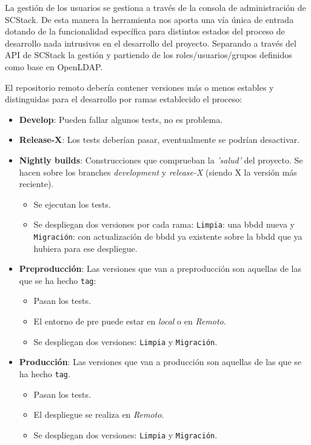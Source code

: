 \par La gestión de los usuarios se gestiona a través de la consola de administración de SCStack. De esta manera la herramienta nos aporta una vía única de entrada dotando de la funcionalidad específica para distintos estados del proceso de desarrollo nada intrusivos en el desarrollo del proyecto. Separando a través del API de SCStack la gestión y partiendo de los roles/usuarios/grupos definidos como base en OpenLDAP.

\par El repositorio remoto debería contener versiones más o menos estables y distinguidas para el desarrollo por ramas establecido el proceso:

\begin{itemize}
	\item \textbf{Develop}: Pueden fallar algunos tests, no es problema.

	\item \textbf{Release-X}: Los tests deberían pasar, eventualmente se podrían desactivar.
	
	\item \textbf{Nightly builds}: Construcciones que comprueban la \emph{'salud'} del proyecto. Se hacen sobre los branches \emph{development} y \emph{release-X} (siendo X la versión más reciente).

    \begin{itemize}
	    \item Se ejecutan los tests.
	    \item Se despliegan dos versiones por cada rama: \texttt{Limpia}: una bbdd nueva y \texttt{Migración}: con actualización de bbdd ya existente sobre la bbdd que ya hubiera para ese despliegue.
    \end{itemize}

	\item \textbf{Preproducción}: Las versiones que van a preproducción son aquellas de las que se ha hecho \texttt{tag}: 
	\begin{itemize}
	    \item Pasan los tests.
	    \item El entorno de pre puede estar en \emph{local} o en \emph{Remoto}.
	    \item Se despliegan dos versiones: \texttt{Limpia} y \texttt{Migración}.
    \end{itemize}

	\item \textbf{Producción}: Las versiones que van a producción son aquellas de las que se ha hecho \texttt{tag}.
	\begin{itemize}
	    \item Pasan los tests.
	    \item El despliegue se realiza en \emph{Remoto}.
	    \item Se despliegan dos versiones: \texttt{Limpia} y \texttt{Migración}.
    \end{itemize}

\end{itemize}

